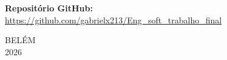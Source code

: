 \vspace{1.5cm}

\noindent\hfill
\begin{minipage}{8cm}
    {\small \textbf{Repositório GitHub:}\\
    \url{https://github.com/gabrielx213/Eng_soft_trabalho_final}}
\end{minipage}
\vspace{3cm}

\onehalfspacing
\begin{center}
    BELÉM\\
    2026
\end{center}

\newpage
\thispagestyle{empty}
\tableofcontents

\newpage
